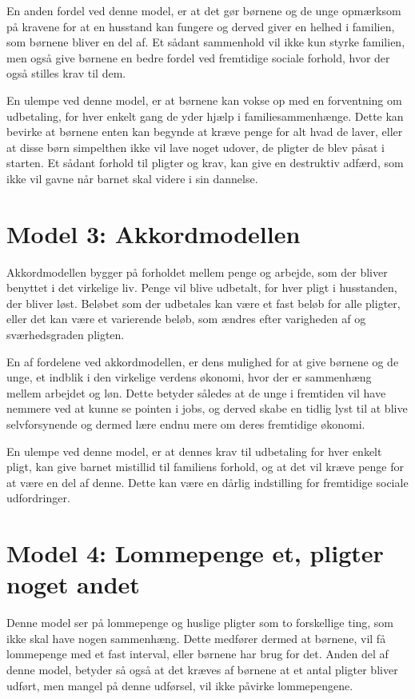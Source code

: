 En anden fordel ved denne model, er at det gør 
børnene og de unge opmærksom på kravene for at 
en husstand kan fungere og derved giver en 
helhed i familien, som børnene bliver en del af. 
Et sådant sammenhold vil ikke kun styrke 
familien, men også give børnene en bedre fordel 
ved fremtidige sociale forhold, hvor der også 
stilles krav til dem.

En ulempe ved denne model, er at børnene kan 
vokse op med en forventning om udbetaling, for 
hver enkelt gang de yder hjælp i 
familiesammenhænge. Dette kan bevirke at børnene 
enten kan begynde at kræve penge for alt hvad de 
laver, eller at disse børn simpelthen ikke vil 
lave noget udover, de pligter de blev påsat i 
starten. Et sådant forhold til pligter og krav, 
kan give en destruktiv adfærd, som ikke vil 
gavne når barnet skal videre i sin dannelse.

\section{Model 3: Akkordmodellen}
Akkordmodellen bygger på forholdet mellem penge 
og arbejde, som der bliver benyttet i det 
virkelige liv. Penge vil blive udbetalt, for 
hver pligt i husstanden, der bliver løst. 
Beløbet som der udbetales kan være et fast beløb 
for alle pligter, eller det kan være et 
varierende beløb, som ændres efter varigheden af 
og sværhedsgraden pligten.

En af fordelene ved akkordmodellen, er dens 
mulighed for at give børnene og de unge, et 
indblik i den virkelige verdens økonomi, hvor 
der er sammenhæng mellem arbejdet og løn. Dette 
betyder således at de unge i fremtiden vil have 
nemmere ved at kunne se pointen i jobs, og 
derved skabe en tidlig lyst til at blive 
selvforsynende og dermed lære endnu mere om 
deres fremtidige økonomi.

En ulempe ved denne model, er at dennes krav til 
udbetaling for hver enkelt pligt, kan give 
barnet mistillid til familiens forhold, og at 
det vil kræve penge for at være en del af denne. 
Dette kan være en dårlig indstilling for 
fremtidige sociale udfordringer.

\section{Model 4: Lommepenge et, pligter 
noget andet}
Denne model ser på lommepenge og huslige pligter 
som to forskellige ting, som ikke skal have 
nogen sammenhæng. Dette medfører dermed at 
børnene, vil få lommepenge med et fast interval, 
eller børnene har brug for det. Anden del af 
denne model, betyder så også at det kræves af 
børnene at et antal pligter bliver udført, men 
mangel på denne udførsel, vil ikke påvirke 
lommepengene.

